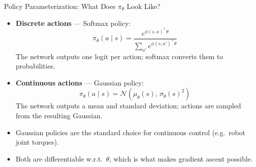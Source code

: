 \begin{frame}{Policy Parameterization: What Does $\pi_\theta$ Look Like?}
    \begin{itemize}
        \item \textbf{Discrete actions} --- Softmax policy:
        \[
            \pi_\theta(a \mid s) = \frac{e^{\phi(s,a)^\top \theta}}{\sum_{a'} e^{\phi(s,a')^\top \theta}}
        \]
        The network outputs one logit per action; softmax converts them to probabilities.
        \pause
        \item \textbf{Continuous actions} --- Gaussian policy:
        \[
            \pi_\theta(a \mid s) = \mathcal{N}\!\left(\mu_\theta(s),\, \sigma_\theta(s)^2\right)
        \]
        The network outputs a mean and standard deviation; actions are sampled from the resulting Gaussian.
        \pause
        \item Gaussian policies are the standard choice for continuous control (e.g.\ robot joint torques).
        \item Both are differentiable w.r.t.\ $\theta$, which is what makes gradient ascent possible.
    \end{itemize}
\end{frame}

